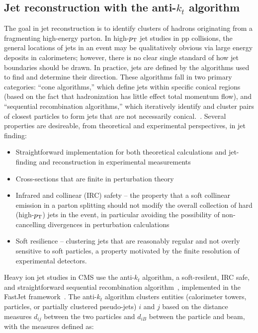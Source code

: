 \subsection{Jet reconstruction with the anti-$k_{t}$ algorithm}

The goal in jet reconstruction is to identify clusters of hadrons originating from a fragmenting high-energy parton.  In high-$p_{\rm T}$ jet studies in pp collisions, the general locations of jets in an event may be qualitatively obvious via large energy deposits in calorimeters;  however, there is no clear single standard of how jet boundaries should be drawn.  In practice, jets are defined by the algorithms used to find and determine their direction.  These algorithms fall in two primary categories:  ``cone algorithms,'' which define jets within specific conical regions (based on the fact that hadronization has little effect total momentum flow), and ``sequential recombination algorithms,'' which iteratively identify and cluster pairs of closest particles to form jets that are not necessarily conical.~\cite{Salam:2009jx, bib_antikt, Cacciari:fastjet1}.  Several properties are desireable, from theoretical and experimental perspectives, in jet finding: 
\begin{itemize}
\item Straightforward implementation for both theoretical calculations and jet-finding and reconstruction in experimental measurements
\item Cross-sections that are finite in perturbation theory
\item Infrared and collinear (IRC) safety -- the property that a soft collinear emission in a parton splitting should not modify the overall collection of hard (high-$p_{\rm T}$) jets in the event, in particular avoiding the possibility of non-cancelling divergences in perturbation calculations
\item Soft resilience -- clustering jets that are reasonably regular and not overly sensitive to soft particles, a property motivated by the finite resolution of experimental detectors.
\end{itemize}

\noindent Heavy ion jet studies in CMS use the anti-$k_{t}$ algorithm, a soft-resilent, IRC safe, and straightforward sequential recombination algorithm~\cite{bib_antikt}, implemented in the FastJet framework~\cite{Cacciari:fastjet1}.  The anti-$k_{t}$ algorithm clusters entities (calorimeter towers, particles, or partially clustered pseudo-jets) $i$ and $j$ based on the distance measures $d_{ij}$ between the two particles and $d_{iB}$ between the particle and beam, with the measures defined as: 

